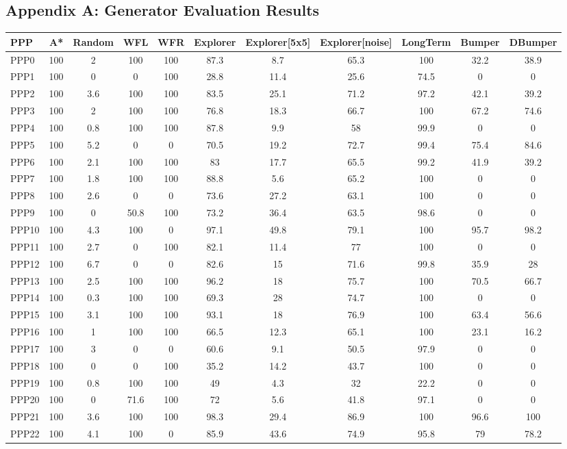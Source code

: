 \documentclass[authoryearcitations]{UoYCSproject}
\begin{document}
\begin{appendices}
\chapter{Appendix A: Generator Evaluation Results}
\label{cha:gen_eval_appendix}

\begin{table}[H]
\scriptsize
\begin{tabular}{|l|c|c|c|c|c|c|c|c|c|c|}
\hline
PPP	& A* & Random & WFL & WFR & Explorer& Explorer[5x5] & Explorer[noise] & LongTerm & Bumper & DBumper \\
\hline
PPP0&100&2&100&100&87.3&8.7&65.3&100&32.2&38.9\\
PPP1&100&0&0&100&28.8&11.4&25.6&74.5&0&0\\
PPP2&100&3.6&100&100&83.5&25.1&71.2&97.2&42.1&39.2\\
PPP3&100&2&100&100&76.8&18.3&66.7&100&67.2&74.6\\
PPP4&100&0.8&100&100&87.8&9.9&58&99.9&0&0\\
PPP5&100&5.2&0&0&70.5&19.2&72.7&99.4&75.4&84.6\\
PPP6&100&2.1&100&100&83&17.7&65.5&99.2&41.9&39.2\\
PPP7&100&1.8&100&100&88.8&5.6&65.2&100&0&0\\
PPP8&100&2.6&0&0&73.6&27.2&63.1&100&0&0\\
PPP9&100&0&50.8&100&73.2&36.4&63.5&98.6&0&0\\
PPP10&100&4.3&100&0&97.1&49.8&79.1&100&95.7&98.2\\
PPP11&100&2.7&0&100&82.1&11.4&77&100&0&0\\
PPP12&100&6.7&0&0&82.6&15&71.6&99.8&35.9&28\\
PPP13&100&2.5&100&100&96.2&18&75.7&100&70.5&66.7\\
PPP14&100&0.3&100&100&69.3&28&74.7&100&0&0\\
PPP15&100&3.1&100&100&93.1&18&76.9&100&63.4&56.6\\
PPP16&100&1&100&100&66.5&12.3&65.1&100&23.1&16.2\\
PPP17&100&3&0&0&60.6&9.1&50.5&97.9&0&0\\
PPP18&100&0&0&100&35.2&14.2&43.7&100&0&0\\
PPP19&100&0.8&100&100&49&4.3&32&22.2&0&0\\
PPP20&100&0&71.6&100&72&5.6&41.8&97.1&0&0\\
PPP21&100&3.6&100&100&98.3&29.4&86.9&100&96.6&100\\
PPP22&100&4.1&100&0&85.9&43.6&74.9&95.8&79&78.2\\

\end{tabular}
\end{table}
\end{appendices}
\end{document}
